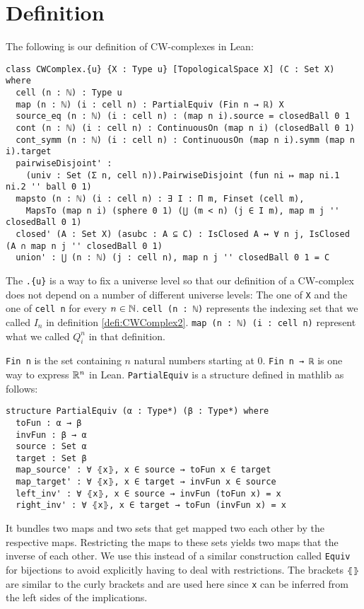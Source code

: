 \section{Definition}

The following is our definition of CW-complexes in Lean:

\begin{lstlisting}
class CWComplex.{u} {X : Type u} [TopologicalSpace X] (C : Set X) where
  cell (n : ℕ) : Type u
  map (n : ℕ) (i : cell n) : PartialEquiv (Fin n → ℝ) X
  source_eq (n : ℕ) (i : cell n) : (map n i).source = closedBall 0 1
  cont (n : ℕ) (i : cell n) : ContinuousOn (map n i) (closedBall 0 1)
  cont_symm (n : ℕ) (i : cell n) : ContinuousOn (map n i).symm (map n i).target
  pairwiseDisjoint' :
    (univ : Set (Σ n, cell n)).PairwiseDisjoint (fun ni ↦ map ni.1 ni.2 '' ball 0 1)
  mapsto (n : ℕ) (i : cell n) : ∃ I : Π m, Finset (cell m),
    MapsTo (map n i) (sphere 0 1) (⋃ (m < n) (j ∈ I m), map m j '' closedBall 0 1)
  closed' (A : Set X) (asubc : A ⊆ C) : IsClosed A ↔ ∀ n j, IsClosed (A ∩ map n j '' closedBall 0 1)
  union' : ⋃ (n : ℕ) (j : cell n), map n j '' closedBall 0 1 = C
\end{lstlisting}

The \lstinline|.{u}| is a way to fix a universe level so that our definition of a CW-complex does not depend on a number of different universe levels: The one of \lstinline{X} and the one of \lstinline{cell n} for every $n \in \mathbb{N}$.
\lstinline{cell (n : ℕ)} represents the indexing set that we called $I_n$ in definition \ref{defi:CWComplex2}. \lstinline{map (n : ℕ) (i : cell n)} represent what we called $Q_i^n$ in that definition. 

\lstinline{Fin n} is the set containing $n$ natural numbers starting at 0. 
\lstinline{Fin n → ℝ} is one way to express $\mathbb{R}^n$ in Lean. 
\lstinline{PartialEquiv} is a structure defined in mathlib as follows: 

\begin{lstlisting}
structure PartialEquiv (α : Type*) (β : Type*) where
  toFun : α → β
  invFun : β → α
  source : Set α
  target : Set β
  map_source' : ∀ ⦃x⦄, x ∈ source → toFun x ∈ target
  map_target' : ∀ ⦃x⦄, x ∈ target → invFun x ∈ source
  left_inv' : ∀ ⦃x⦄, x ∈ source → invFun (toFun x) = x
  right_inv' : ∀ ⦃x⦄, x ∈ target → toFun (invFun x) = x
\end{lstlisting}

It bundles two maps and two sets that get mapped two each other by the respective maps. 
Restricting the maps to these sets yields two maps that the inverse of each other. 
We use this instead of a similar construction called \lstinline{Equiv} for bijections to avoid explicitly having to deal with restrictions. 
The brackets \lstinline{⦃⦄} are similar to the curly brackets and are used here since \lstinline{x} can be inferred from the left sides of the implications.

